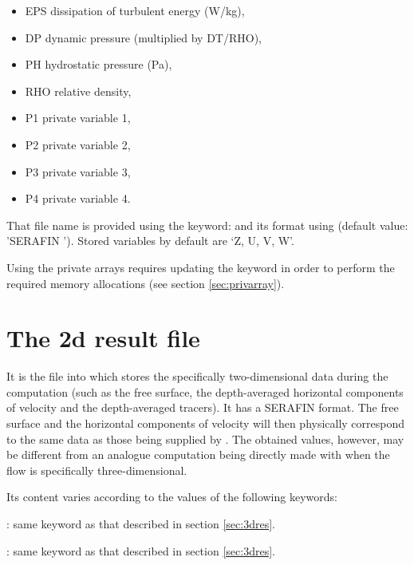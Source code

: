 \begin{itemize}
\item EPS dissipation of turbulent energy (W/kg),

\item DP dynamic pressure (multiplied by DT/RHO),

\item PH hydrostatic pressure (Pa),

\item RHO relative density,

\item P1 private variable 1,

\item P2 private variable 2,

\item P3 private variable 3,

\item P4 private variable 4.
\end{itemize}

That file name is provided using the keyword:  and its
format using  (default value: 'SERAFIN '). Stored
variables by default are `Z, U, V, W'.

Using the private arrays requires updating the keyword  in order to perform the required memory allocations (see
section \ref{sec:privarray}).

\section{The 2d result file}

It is the file into which  stores the specifically two-dimensional
data during the computation (such as the free surface, the depth-averaged
horizontal components of velocity and the depth-averaged tracers). It has a
SERAFIN format. The free surface and the horizontal components of velocity will
then physically correspond to the same data as those being supplied by
. The obtained values, however, may be different from an analogue
computation being directly made with  when the flow is specifically
three-dimensional.

Its content varies according to the values of the following keywords:

: same keyword as that
described in section \ref{sec:3dres}.

: same keyword as that described in section
\ref{sec:3dres}.

